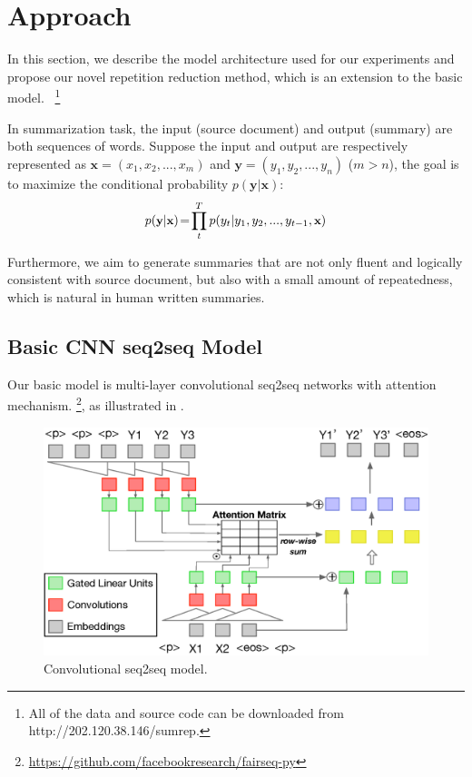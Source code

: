 \section{Approach}
\label{sec:approach}

In this section, we describe the model architecture used for our experiments
and propose our novel repetition reduction method, which is an extension to the basic model.
~\footnote{
All of the data and source code
can be downloaded from http://202.120.38.146/sumrep.}

In summarization task, the input (source document) and
output (summary) are both sequences of words.
Suppose the input and output are respectively represented as
$\textbf{x} = (x_{1},x_{2},...,x_{m})$ and 
$\textbf{y} = (y_{1}, y_{2},..., y_{n})$ ($m>n$),
the goal is to maximize the conditional probability
$p(\textbf{y}|\textbf{x})$:
\begin{equation}
\small
p(\textbf{y} | \textbf{x}) \!=\! {\prod^T_{t} {p(y_{t} | y_{1}, y_{2},..., y_{t-1}, \textbf{x}})}
\end{equation}

Furthermore, we aim to generate summaries that are not only fluent 
and logically consistent with source document, but also with 
a small amount of repeatedness, which is natural in human written summaries.  

\subsection{Basic CNN seq2seq Model}
\label{sec:basic}
Our basic model is multi-layer convolutional seq2seq networks \cite{gehring2017convs2s} with attention mechanism.
\footnote{\url{https://github.com/facebookresearch/fairseq-py}}, 
as illustrated in . 

\begin{figure}[th]
    \centering
    \includegraphics[width=0.8\linewidth]{cnn}
    \caption{Convolutional seq2seq model.}
    \label{fig:basicModel}
\end{figure}

